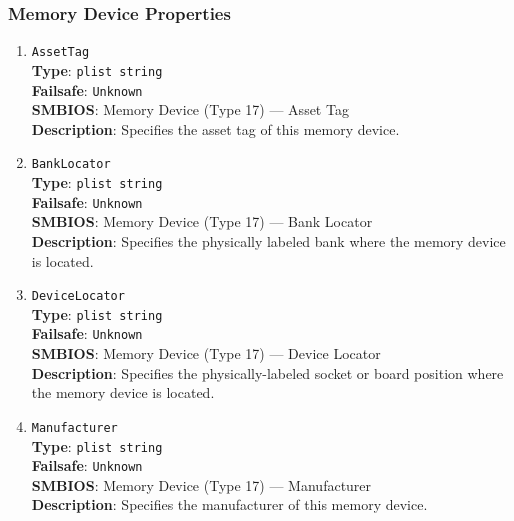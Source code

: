 \documentclass[]{article}
\begin{document}
\subsubsection{Memory Device Properties}\label{platforminfomemorydevice}

\begin{enumerate}
\item
  \texttt{AssetTag}\\
  \textbf{Type}: \texttt{plist\ string}\\
  \textbf{Failsafe}: \texttt{Unknown}\\
  \textbf{SMBIOS}: Memory Device (Type 17) --- Asset Tag\\
  \textbf{Description}: Specifies the asset tag of this memory device.

\item
  \texttt{BankLocator}\\
  \textbf{Type}: \texttt{plist\ string}\\
  \textbf{Failsafe}: \texttt{Unknown}\\
  \textbf{SMBIOS}: Memory Device (Type 17) --- Bank Locator\\
  \textbf{Description}: Specifies the physically labeled bank where the
  memory device is located.

\item
  \texttt{DeviceLocator}\\
  \textbf{Type}: \texttt{plist\ string}\\
  \textbf{Failsafe}: \texttt{Unknown}\\
  \textbf{SMBIOS}: Memory Device (Type 17) --- Device Locator\\
  \textbf{Description}: Specifies the physically-labeled socket or
  board position where the memory device is located.

\item
  \texttt{Manufacturer}\\
  \textbf{Type}: \texttt{plist\ string}\\
  \textbf{Failsafe}: \texttt{Unknown}\\
  \textbf{SMBIOS}: Memory Device (Type 17) --- Manufacturer\\
  \textbf{Description}: Specifies the manufacturer of this memory device.


\end{enumerate}
\end{document}
